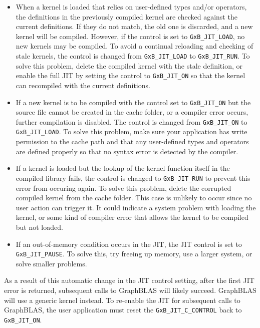 \documentclass[12pt]{article}
\begin{document}
\begin{itemize}

\item When a kernel is loaded that relies on user-defined types and/or
operators, the definitions in the previously compiled kernel are checked
against the current definitions.  If they do not match, the old one is
discarded, and a new kernel will be compiled.  However, if the control is set
to \verb'GxB_JIT_LOAD', no new kernels may be compiled.  To avoid a continual
reloading and checking of stale kernels, the control is changed from
\verb'GxB_JIT_LOAD' to \verb'GxB_JIT_RUN'.  To solve this problem, delete the
compiled kernel with the stale definition, or enable the full JIT by setting
the control to \verb'GxB_JIT_ON' so that the kernel can recompiled with the
current definitions.

\item If a new kernel is to be compiled with the control set to
\verb'GxB_JIT_ON' but the source file cannot be created in the cache folder, or
a compiler error occurs, further compilation is disabled.  The control is
changed from \verb'GxB_JIT_ON' to \verb'GxB_JIT_LOAD'.
To solve this problem, make sure your application has write permission to the
cache path and that any user-defined types and operators are defined properly
so that no syntax error is detected by the compiler.

\item If a kernel is loaded but the lookup of the kernel function itself in the
compiled library fails, the control is changed to \verb'GxB_JIT_RUN' to prevent
this error from occuring again.  To solve this problem, delete the corrupted
compiled kernel from the cache folder.  This case is unlikely to occur since no
user action can trigger it.  It could indicate a system problem with loading
the kernel, or some kind of compiler error that allows the kernel to be
compiled but not loaded.

\item If an out-of-memory condition occurs in the JIT, the JIT control is
set to \verb'GxB_JIT_PAUSE'.  To solve this, try freeing up memory, use a
larger system, or solve smaller problems.

\end{itemize}

As a result of this automatic change in the JIT control setting, after the
first JIT error is returned, subsequent calls to GraphBLAS will likely succeed.
GraphBLAS will use a generic kernel instead.  To re-enable the JIT for
subsequent calls to GraphBLAS, the user application must reset the
\verb'GxB_JIT_C_CONTROL' back to \verb'GxB_JIT_ON'.
\end{document}
